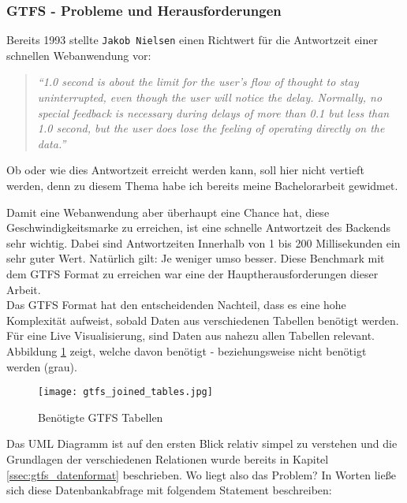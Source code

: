 \subsubsection{GTFS - Probleme und Herausforderungen}
\label{ssub:gtfs_probleme_und_herausforderungen}
   Bereits 1993 stellte \texttt{Jakob Nielsen} einen Richtwert für die Antwortzeit einer schnellen Webanwendung vor:

  \begin{quote}
    \textit{"`1.0 second is about the limit for the user's flow of thought to stay uninterrupted, even though the user will notice the delay. Normally, no special feedback is necessary during delays of more than 0.1 but less than 1.0 second, but the user does lose the feeling of operating directly on the data."'}\parencite{nielsen}
  \end{quote}

  Ob oder wie dies Antwortzeit erreicht werden kann, soll hier nicht vertieft werden, denn zu diesem Thema habe ich bereits meine Bachelorarbeit gewidmet\parencite{lorer}.

  Damit eine Webanwendung aber überhaupt eine Chance hat, diese Geschwindigkeitsmarke zu erreichen, ist eine schnelle Antwortzeit des Backends sehr wichtig. Dabei sind Antwortzeiten Innerhalb von 1 bis 200 Millisekunden ein sehr guter Wert. Natürlich gilt: Je weniger umso besser. Diese Benchmark mit dem GTFS Format zu erreichen war eine der Hauptherausforderungen dieser Arbeit.\\

  Das GTFS Format hat den entscheidenden Nachteil, dass es eine hohe Komplexität aufweist, sobald Daten aus verschiedenen Tabellen benötigt werden. Für eine Live Visualisierung, sind Daten aus nahezu allen Tabellen relevant. Abbildung \ref{fig:gtfs_joined_tables} zeigt, welche davon benötigt - beziehungsweise nicht benötigt werden (grau).

  \begin{figure}[ht]
    \begin{center}
      \texttt{[image: gtfs\_joined\_tables.jpg]}
      \caption{Benötigte GTFS Tabellen\parencite{google_gtfs_reference}}
      \label{fig:gtfs_joined_tables}
    \end{center}
  \end{figure}

  Das UML Diagramm ist auf den ersten Blick relativ simpel zu verstehen und die Grundlagen der verschiedenen Relationen wurde bereits in Kapitel \ref{ssec:gtfs_datenformat} beschrieben. Wo liegt also das Problem? In Worten ließe sich diese Datenbankabfrage mit folgendem Statement beschreiben: 

